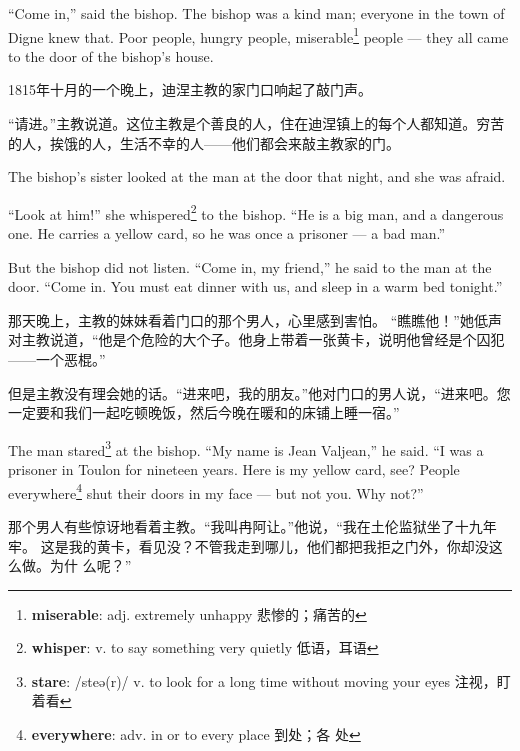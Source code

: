 \documentclass[fontset=ubuntu, zihao=5]{ctexart}
\newcommand\doulos[1]{{\fontspec{Doulos SIL} /#1/}}
\begin{document}
\begin{paracol}{2}
  ``Come in,'' said the bishop. The bishop was a kind man; everyone in the town of Digne knew that. Poor people, hungry people, miserable\footnote{\textbf{miserable}: adj. extremely unhappy 悲惨的；痛苦的} people --- they all came to the door of the bishop's house.

  \switchcolumn

  \sectionbreak

  1815年十月的一个晚上，迪涅主教的家门口响起了敲门声。

  “请进。”主教说道。这位主教是个善良的人，住在迪涅镇上的每个人都知道。穷苦
  的人，挨饿的人，生活不幸的人——他们都会来敲主教家的门。

  \switchcolumn*

  The bishop's sister looked at the man at the door that night, and she was afraid.

  ``Look at him!'' she whispered\footnote{\textbf{whisper}: v. to say
    something very quietly 低语，耳语} to the bishop. ``He is a big man, and
  a dangerous one. He carries a yellow card, so he was once a prisoner --- a
  bad man.''

  But the bishop did not listen. ``Come in, my friend,'' he said to the man at the door. ``Come in. You must eat dinner with us, and sleep in a warm bed tonight.''

  \switchcolumn

  那天晚上，主教的妹妹看着门口的那个男人，心里感到害怕。
  “瞧瞧他！”她低声对主教说道，“他是个危险的大个子。他身上带着一张黄卡，说明他曾经是个囚犯——一个恶棍。”


  但是主教没有理会她的话。“进来吧，我的朋友。”他对门口的男人说，“进来吧。您一定要和我们一起吃顿晚饭，然后今晚在暖和的床铺上睡一宿。”

  \switchcolumn*

  The man stared\footnote{\textbf{stare}: \doulos{steə(r)} v. to look for a
    long time without moving your eyes 注视，盯着看} at the bishop. ``My
  name is Jean Valjean,'' he said. ``I was a prisoner in Toulon for nineteen
  years. Here is my yellow card, see? People
  everywhere\footnote{\textbf{everywhere}: adv. in or to every place 到处；各
    处} shut their doors in my face --- but not you. Why not?''

  \switchcolumn

  那个男人有些惊讶地看着主教。“我叫冉阿让。”他说，“我在土伦监狱坐了十九年牢。
  这是我的黄卡，看见没？不管我走到哪儿，他们都把我拒之门外，你却没这么做。为什
  么呢？”

  \switchcolumn*


\end{paracol}
\end{document}
